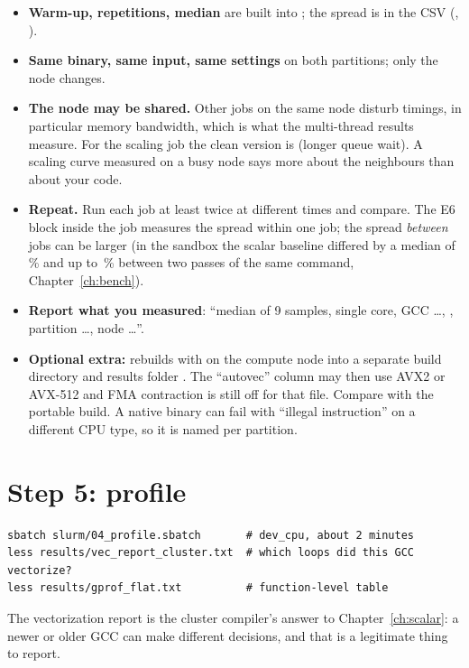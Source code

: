 \begin{itemize}
\item \textbf{Warm-up, repetitions, median} are built into ; the spread is in the CSV (, ).
\item \textbf{Same binary, same input, same settings} on both partitions; only the node changes.
\item \textbf{The node may be shared.} Other jobs on the same node disturb timings, in particular memory bandwidth, which is what the multi-thread results measure. For the scaling job the clean version is  (longer queue wait). A scaling curve measured on a busy node says more about the neighbours than about your code.
\item \textbf{Repeat.} Run each job at least twice at different times and compare. The E6 block inside the job measures the spread within one job; the spread \emph{between} jobs can be larger (in the sandbox the scalar baseline differed by a median of \betweenScalarMed\,\% and up to \betweenScalarMax\,\% between two passes of the same command, Chapter~\ref{ch:bench}).
\item \textbf{Report what you measured}: ``median of 9 samples, single core, GCC \dots, , partition \dots, node \dots''.
\item \textbf{Optional extra:}  rebuilds with  on the compute node into a separate build directory and results folder . The ``autovec'' column may then use AVX2 or AVX-512 and FMA contraction is still off for that file. Compare with the portable build. A native binary can fail with ``illegal instruction'' on a different CPU type, so it is named per partition.
\end{itemize}

\section{Step 5: profile}

\begin{lstlisting}[style=shell]
sbatch slurm/04_profile.sbatch       # dev_cpu, about 2 minutes
less results/vec_report_cluster.txt  # which loops did this GCC vectorize?
less results/gprof_flat.txt          # function-level table
\end{lstlisting}
The vectorization report is the cluster compiler's answer to Chapter~\ref{ch:scalar}: a newer or older GCC can make different decisions, and that is a legitimate thing to report.

